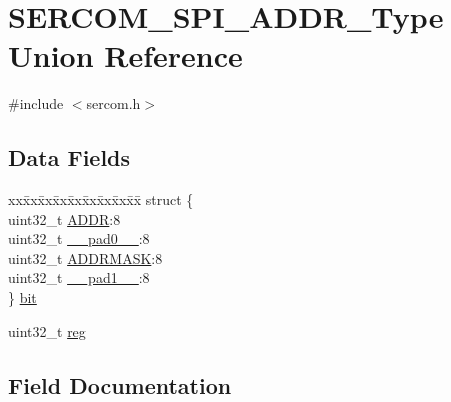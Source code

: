 \hypertarget{union_s_e_r_c_o_m___s_p_i___a_d_d_r___type}{}\section{S\+E\+R\+C\+O\+M\+\_\+\+S\+P\+I\+\_\+\+A\+D\+D\+R\+\_\+\+Type Union Reference}
\label{union_s_e_r_c_o_m___s_p_i___a_d_d_r___type}


{\ttfamily \#include $<$sercom.\+h$>$}

\subsection*{Data Fields}
\begin{DoxyCompactItemize}
\item 
\begin{tabbing}
xx\=xx\=xx\=xx\=xx\=xx\=xx\=xx\=xx\=\kill
struct \{\\
\>uint32\_t \mbox{\hyperlink{union_s_e_r_c_o_m___s_p_i___a_d_d_r___type_ac9f49eaa00ec245d66e5342c02bcce9f}{ADDR}}:8\\
\>uint32\_t \mbox{\hyperlink{union_s_e_r_c_o_m___s_p_i___a_d_d_r___type_a3e57c2ef1c3ffb36722f000cc1156824}{\_\_pad0\_\_}}:8\\
\>uint32\_t \mbox{\hyperlink{union_s_e_r_c_o_m___s_p_i___a_d_d_r___type_a475adb7db2ff7161b68651e8aba62bad}{ADDRMASK}}:8\\
\>uint32\_t \mbox{\hyperlink{union_s_e_r_c_o_m___s_p_i___a_d_d_r___type_a6712ba6dd1d5b43d2d56ff8ac4e275a7}{\_\_pad1\_\_}}:8\\
\} \mbox{\hyperlink{union_s_e_r_c_o_m___s_p_i___a_d_d_r___type_a181a72ea5a464de1ee92c843438ad959}{bit}}\\

\end{tabbing}\item 
uint32\+\_\+t \mbox{\hyperlink{union_s_e_r_c_o_m___s_p_i___a_d_d_r___type_a6b91636401516a477989a336376d7b40}{reg}}
\end{DoxyCompactItemize}


\subsection{Field Documentation}
\mbox{\label{union_s_e_r_c_o_m___s_p_i___a_d_d_r___type_a3e57c2ef1c3ffb36722f000cc1156824}} 

